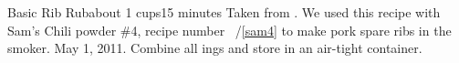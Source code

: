 \begin{recipe}{Basic Rib Rub}{about 1 cups}{15 minutes}
\freeform Taken from \emph{}. We used this recipe with Sam's Chili powder \#4, recipe number \string~/\ref{sam4} to make pork spare ribs in the smoker.  May 1, 2011.
Combine all ings and store in an air-tight container.
\end{recipe}
